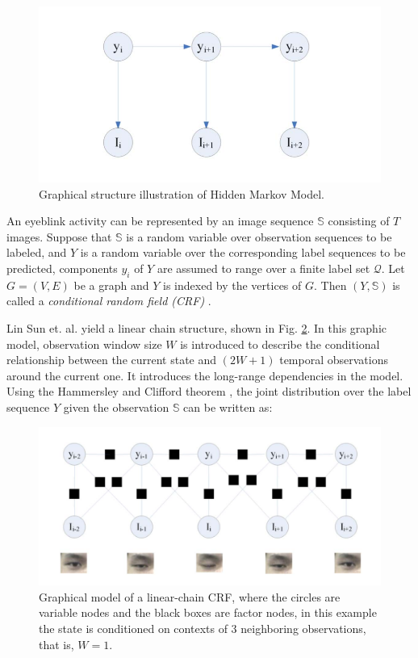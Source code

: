 \documentclass[journal]{IEEEtran}
\begin{document}
\begin{figure}[!t]
\centering
\includegraphics[width=1\linewidth]{img/D_1}
\caption{Graphical structure illustration of Hidden Markov Model.}
\label{fig_D_1}
\end{figure}

An eyeblink activity can be represented by an image sequence $\mathbb{S}$ consisting of $T$ images. Suppose that $\mathbb{S}$ is a random variable over observation sequences to be labeled, and $Y$ is a random variable over the corresponding label sequences to be predicted, components $y_i$ of $Y$ are assumed to range over a finite label set $\mathcal{Q}$. Let $G=(V,E)$ be a graph and $Y$ is indexed by the vertices of $G$. Then $(Y, \mathbb{S})$ is called a \textit{conditional random field (CRF)} \cite{lafferty2001conditional}.

Lin Sun et. al. \cite{pan2007eyeblink} yield a linear chain structure, shown in Fig. \ref{fig_D_2}. In this graphic model, observation window size $W$ is introduced to describe the conditional relationship between the current state and $(2W+1)$ temporal observations around the current one. It introduces the long-range dependencies in the model. Using the Hammersley and Clifford theorem \cite{li2009markov}, the joint distribution over the label sequence $Y$ given the observation $\mathbb{S}$ can be written as:

\begin{figure}[!t]
\centering
\includegraphics[width=0.95\linewidth]{img/D_2}
\caption{Graphical model of a linear-chain CRF, where the circles are variable nodes and the black boxes are factor nodes, in this example the state is conditioned on contexts of 3 neighboring observations, that is, $W=1$.}
\label{fig_D_2}
\end{figure}
\end{document}
